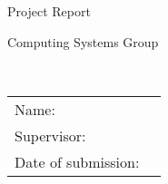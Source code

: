 \begin{titlepage}
\begin{addmargin}[-1cm]{-3cm}
	\begin{center}
		\begingroup
		\Huge
		Project Report \\ \bigskip
		\endgroup

		\begingroup
		\Large
		Computing Systems Group \\ \smallskip
		\endgroup

		\begingroup
		\Huge
		\myThesisTitle \\ \smallskip
		\endgroup

		\vfill
		\hfill
	\end{center}
	\begingroup
	\large
	\noindent
	\begin{tabular}{ll}
		Name: & \myName \\
		Supervisor: & \mySupervisor \\
		Date of submission: & \myThesisSubmissionDate \\
	\end{tabular}
	\endgroup
\end{addmargin}
\end{titlepage}
\cleardoublepage
